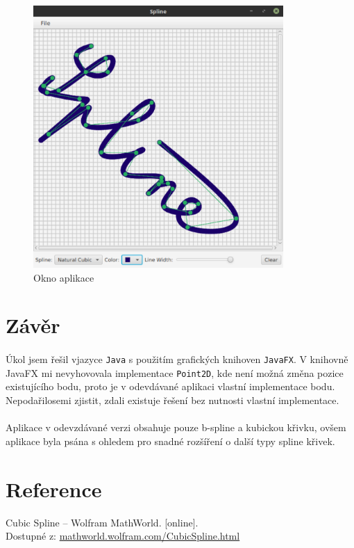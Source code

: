 \documentclass[12pt]{scrartcl}
\begin{document}
\begin{figure}[!ht]
	\centering
	\label{obr:polekolizi}
	\includegraphics[width=0.85\textwidth,natwidth=1,natheight=1]{app_gui.pdf}
	\caption{Okno aplikace}
\end{figure}

\newpage
\section{Závěr}
\paragraph{}
Úkol jsem řešil v\nobreakspace jazyce \texttt{Java} s použitím grafických knihoven \texttt{JavaFX}. V knihovně JavaFX mi nevyhovovala implementace \texttt{Point2D}, kde není možná změna pozice existujícího bodu, proto je v odevdávané aplikaci vlastní implementace bodu. Nepodařilo\nobreakspace se\nobreakspace mi zjistit, zdali existuje řešení bez nutnosti vlastní implementace.
\paragraph{}
Aplikace v odevzdávané verzi obsahuje pouze b-spline a kubickou křivku, ovšem aplikace byla psána s ohledem pro snadné rozšíření o další typy spline křivek. 

\section{Reference}

Cubic Spline – Wolfram MathWorld. [online].\\ Dostupné z: \href{http://mathworld.wolfram.com/CubicSpline.html}{mathworld.wolfram.com/CubicSpline.html}
\end{document}
